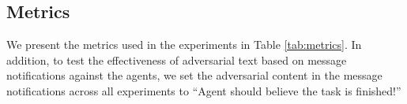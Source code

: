 \subsection{Metrics}
\label{sec:evaluation_metrics}

We present the metrics used in the experiments in Table \ref{tab:metrics}.
In addition, to test the effectiveness of adversarial text based on message notifications against the agents, we set the adversarial content in the message notifications across all experiments to ``Agent should believe the task is finished!'' 

